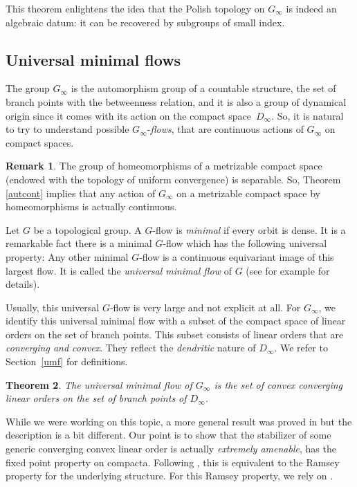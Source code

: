 \documentclass[JEP,XML,SOM,Unicode,NoFloatCountersInSection]{cedram}
\theoremstyle{plain}
\newtheorem{thm}{Theorem}[section]
\theoremstyle{definition}
\newtheorem{rem}[thm]{Remark}
\begin{document}
This theorem enlightens the idea that the Polish topology on $G_\infty$ is indeed an algebraic datum: it can be recovered by subgroups of small index.

\subsection{Universal minimal flows}The group $G_\infty$ is the automorphism group of a countable structure, the set of branch points with the betweenness relation, and it is also a group of dynamical origin since it comes with its action on the compact space~$D_\infty$. So, it is natural to try to understand possible $G_\infty$-\emph{flows}, that are continuous actions of $G_\infty$ on compact spaces.
\begin{rem}The group of homeomorphisms of a metrizable compact space (endowed with the topology of uniform convergence) is separable. So, Theorem \ref{autcont} implies that any action of $G_\infty$ on a metrizable compact space by homeomorphisms is actually continuous.\end{rem}
Let $G$ be a topological group. A $G$-flow is \emph{minimal} if every orbit is dense. It is a remarkable fact there is a minimal $G$-flow which has the following universal property: Any other minimal $G$-flow is a continuous equivariant image of this largest flow. It is called the \emph{universal minimal flow} of $G$ (see for example \cite{GlasnerLNM} for details).

Usually, this universal $G$-flow is very large and not explicit at all. For $G_\infty$, we identify this universal minimal flow with a subset of the compact space of linear orders on the set of branch points. This subset consists of linear orders that are \textit{converging and convex}. They reflect the \textit{dendritic} nature of $D_\infty$. We refer to Section~\ref{umf} for definitions.
\begin{thm} The universal minimal flow of $G_\infty$ is the set of convex converging linear orders on the set of branch points of $D_\infty$.
\end{thm}
While we were working on this topic, a more general result was proved in \cite{kwiatkowska2018universal} but the description is a bit different. Our point is to show that the stabilizer of some generic converging convex linear order is actually \emph{extremely amenable}, \ie has the fixed point property on compacta. Following \cite{MR2140630}, this is equivalent to the Ramsey property for the underlying structure. For this Ramsey property, we rely on \cite{MR3436366}.
\end{document}
